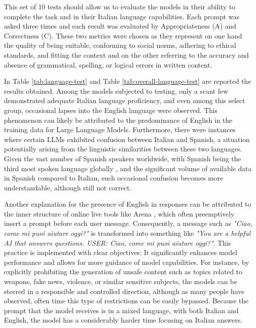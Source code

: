 This set of 10 tests should allow us to evaluate the models in their ability to complete the task and in their Italian language capabilities. Each prompt was asked three times and each result was evaluated by Appropriateness (A) and Correctness (C). These two metrics were chosen as they represent on one hand the quality of being suitable, conforming to social norms, adhering to ethical standards, and fitting the context and on the other referring to the accuracy and absence of grammatical, spelling, or logical errors in written content. 



In Table \ref{tab:language-test} and Table \ref{tab:overall-language-test} are reported the results obtained.
Among the models subjected to testing, only a scant few demonstrated adequate Italian language proficiency, and even among this select group, occasional lapses into the English language were observed. This phenomenon can likely be attributed to the predominance of English in the training data for Large Language Models. Furthermore, there were instances where certain LLMs exhibited confusion between Italian and Spanish, a situation potentially arising from the linguistic similarities between these two languages. Given the vast number of Spanish speakers worldwide, with Spanish being the third most spoken language globally \cite{}, and the significant volume of available data in Spanish compared to Italian, such occasional confusion becomes more understandable, although still not correct.

Another explanation for the presence of English in responses can be attributed to the inner structure of online live tools like Arena \cite{arena}, which often preemptively insert a prompt before each user message. Consequently, a message such as \emph{"Ciao, come mi puoi aiutare oggi?"} is transformed into something like \emph{"You are a helpful AI that answers questions. USER: Ciao, come mi puoi aiutare oggi?"}. This practice is implemented with clear objectives: It significantly enhances model performance and allows for more guidance of model capabilities. For instance, by explicitly prohibiting the generation of unsafe content such as topics related to weapons, fake news, violence, or similar sensitive subjects, the models can be steered in a responsible and controlled direction, although as many people have observed, often time this type of restrictions can be easily bypassed. Because the prompt that the model receives is in a mixed language, with both Italian and English, the model has a considerably harder time focusing on Italian answers.

